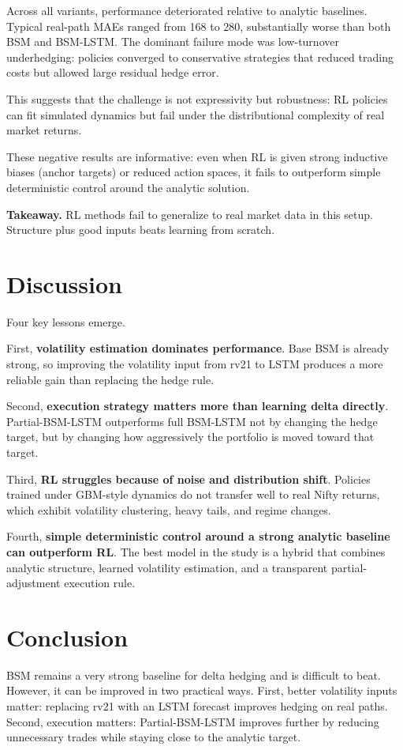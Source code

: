 \documentclass[10pt,a4paper]{article}
\begin{document}
Across all variants, performance deteriorated relative to analytic baselines.
Typical real-path MAEs ranged from 168 to 280, substantially worse than both
BSM and BSM-LSTM. The dominant failure mode was low-turnover underhedging:
policies converged to conservative strategies that reduced trading costs but
allowed large residual hedge error.

This suggests that the challenge is not expressivity but robustness: RL
policies can fit simulated dynamics but fail under the distributional
complexity of real market returns.

These negative results are informative: even when RL is given strong inductive
biases (anchor targets) or reduced action spaces, it fails to outperform simple
deterministic control around the analytic solution.

\textbf{Takeaway.} RL methods fail to generalize to real market data in this
setup. Structure plus good inputs beats learning from scratch.

\section{Discussion}
Four key lessons emerge.

First, \textbf{volatility estimation dominates performance}. Base BSM is
already strong, so improving the volatility input from rv21 to LSTM produces a
more reliable gain than replacing the hedge rule.

Second, \textbf{execution strategy matters more than learning delta directly}.
Partial-BSM-LSTM outperforms full BSM-LSTM not by changing the hedge target,
but by changing how aggressively the portfolio is moved toward that target.

Third, \textbf{RL struggles because of noise and distribution shift}. Policies
trained under GBM-style dynamics do not transfer well to real Nifty returns,
which exhibit volatility clustering, heavy tails, and regime changes.

Fourth, \textbf{simple deterministic control around a strong analytic baseline
can outperform RL}. The best
model in the study is a hybrid that combines analytic structure, learned
volatility estimation, and a transparent partial-adjustment execution rule.

\section{Conclusion}
BSM remains a very strong baseline for delta hedging and is difficult to beat.
However, it can be improved in two practical ways. First, better volatility
inputs matter: replacing rv21 with an LSTM forecast improves hedging on real
paths. Second, execution matters: Partial-BSM-LSTM improves further by reducing
unnecessary trades while staying close to the analytic target.
\end{document}
